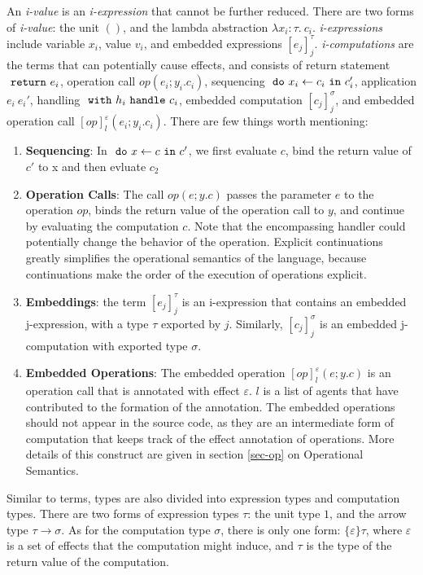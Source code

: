 An \emph{i-value} is an \emph{i-expression} that cannot be further reduced. There are two forms of \emph{i-value}: the unit $()$, and the lambda abstraction $\lambda x_i: \tau.\ c_i$. \emph{i-expressions} include variable $x_i$, value $v_i$, and embedded expressions $[e_j]^\tau_j$. \emph{i-computations} are the terms that can potentially cause effects, and consists of return statement $\ \texttt{return}\  e_i$, operation call $op(e_i; y_i.c_i)$, sequencing $\ \texttt{do}\  x_i \leftarrow c_i \ \texttt{in}\  c_i'$, application $e_i\ e_i'$, handling $\ \texttt{with}\  h_i \ \texttt{handle}\  c_i$, embedded computation $[c_j]^\sigma_j$, and embedded operation call $[op]^\varepsilon_l(e_i; y_i.c_i)$. There are few things worth mentioning: 
\begin{enumerate}
\item[] \textbf{Sequencing}: In $\ \texttt{do}\  x \leftarrow c \ \texttt{in}\  c'$, we first evaluate $c$,  bind the return value of $c'$ to x and then evluate $c_2$
\item[] \textbf{Operation Calls}: The call $op(e; y.c)$ passes the parameter $e$ to the operation $op$,  binds the return value of the operation call to $y$, and continue by evaluating the computation $c$. Note that the encompassing handler could potentially change the behavior of the operation.  Explicit continuations greatly simplifies the operational semantics of the language, because continuations make the order of the execution of operations explicit. 
\item[] \textbf{Embeddings}: the term $[e_j]^\tau_j$ is an i-expression that contains an embedded j-expression, with a type $\tau$ exported by $j$. Similarly, $[c_j]^\sigma_j$ is an embedded j-computation with exported type $\sigma$.
\item[] \textbf{Embedded Operations}: The embedded operation $[op]^\varepsilon_l(e; y.c)$ is an operation call that is annotated with effect $\varepsilon$. $l$ is a list of agents that have contributed to the formation of the annotation.  The embedded operations should not appear in the source code, as they are an intermediate form of computation that keeps track of the effect annotation of operations. More details of this construct are given in section \ref{sec-op} on Operational Semantics.
\end{enumerate} 

Similar to terms, types are also divided into expression types and computation types. There are two forms of expression types $\tau$: the unit type $1$, and the arrow type $\tau \rightarrow \sigma$. As for the computation type $\sigma$, there is only one form: $\{\varepsilon\}\tau$, where $\varepsilon$ is a set of effects that the computation might induce, and $\tau$ is the type of the return value of the computation. 


